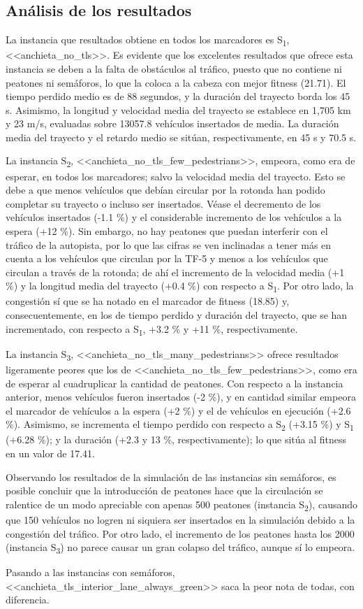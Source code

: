 \subsection{Análisis de los resultados}

La instancia que resultados obtiene en todos los marcadores es S\textsubscript{1}, <<anchieta\_no\_tls>>. Es evidente que los excelentes resultados que ofrece esta instancia se deben a la falta de obstáculos al tráfico, puesto que no contiene ni peatones ni semáforos, lo que la coloca a la cabeza con mejor fitness (21.71). El tiempo perdido medio es de 88 segundos, y la duración del trayecto borda los 45 s. Asimismo, la longitud y velocidad media del trayecto se establece en 1,705 km y 23 m/s, evaluadas sobre 13057.8 vehículos insertados de media. La duración media del trayecto y el retardo medio se sitúan, respectivamente, en 45 s y 70.5 s.

La instancia S\textsubscript{2}, <<anchieta\_no\_tls\_few\_pedestrians>>, empeora, como era de esperar, en todos los marcadores; salvo la velocidad media del trayecto. Esto se debe a que menos vehículos que debían circular por la rotonda han podido completar su trayecto o incluso ser insertados. Véase el decremento de los vehículos insertados (-1.1 \%) y el considerable incremento de los vehículos a la espera (+12 \%). Sin embargo, no hay peatones que puedan interferir con el tráfico de la autopista, por lo que las cifras se ven inclinadas a tener más en cuenta a los vehículos que circulan por la TF-5 y menos a los vehículos que circulan a través de la rotonda; de ahí el incremento de la velocidad media (+1 \%) y la longitud media del trayecto (+0.4 \%) con respecto a S\textsubscript{1}. Por otro lado, la congestión sí que se ha notado en el marcador de fitness (18.85) y, consecuentemente, en los de tiempo perdido y duración del trayecto, que se han incrementado, con respecto a S\textsubscript{1}, +3.2 \% y +11 \%, respectivamente.

La instancia S\textsubscript{3}, <<anchieta\_no\_tls\_many\_pedestrians>> ofrece resultados ligeramente peores que los de <<anchieta\_no\_tls\_few\_pedestrians>>, como era de esperar al cuadruplicar la cantidad de peatones. Con respecto a la instancia anterior, menos vehículos fueron insertados (-2 \%), y en cantidad similar empeora el marcador de vehículos a la espera (+2 \%) y el de vehículos en ejecución (+2.6 \%). Asimismo, se incrementa el tiempo perdido con respecto a S\textsubscript{2} (+3.15 \%) y S\textsubscript{1} (+6.28 \%); y la duración (+2.3 y 13 \%, respectivamente); lo que sitúa al fitness en un valor de 17.41.

Observando los resultados de la simulación de las instancias sin semáforos, es posible concluir que la introducción de peatones hace que la circulación se ralentice de un modo apreciable con apenas 500 peatones (instancia S\textsubscript{2}), causando que 150 vehículos no logren ni siquiera ser insertados en la simulación debido a la congestión del tráfico. Por otro lado, el incremento de los peatones hasta los 2000 (instancia S\textsubscript{3}) no parece causar un gran colapso del tráfico, aunque sí lo empeora.

Pasando a las instancias con semáforos, <<anchieta\_tls\_interior\_lane\_always\_green>> saca la peor nota de todas, con diferencia. 